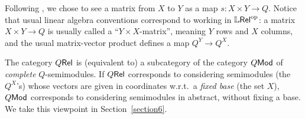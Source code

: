  
 \begin{remark}
 Following \cite{Manzo2013, Hofmann2014, Ehrhard2005}, we 
 chose to see a matrix from $X$ to $Y$ as a map $s:X\times Y\to Q$.
% 
Notice that usual linear algebra conventions correspond to working in $\mathbb{L} \mathsf{Rel}^{\mathrm{op}}$: a matrix $X\times Y\to Q$ is usually called a ``$Y\times X$-matrix'', meaning $Y$ rows and $X$ columns, and the usual matrix-vector product defines a map $Q^Y\to Q^X$.
\end{remark}
%
%
%
%

\begin{remark}
 The category $Q \mathsf{Rel}$ is (equivalent to) a subcategory of the category $Q\mathsf{Mod}$ of \emph{complete} $Q$-semimodules.
 If $Q \mathsf{Rel}$ corresponds to considering semimodules (the $Q^X$'s) whose vectors are given in coordinates w.r.t.\ a \emph{fixed base} (the set $X$), $Q\mathsf{Mod}$ corresponds to considering semimodules in abstract, without fixing a base.
 We take this viewpoint in Section~\ref{section6}.
\end{remark}


